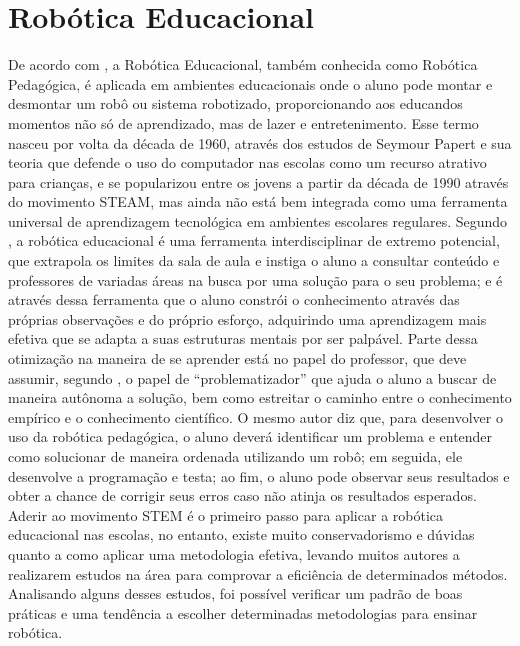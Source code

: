\section{Robótica Educacional}\label{sec:robot_educ}
De  acordo com \cite{nascimento}, a Robótica Educacional, também conhecida como Robótica Pedagógica, é aplicada em ambientes educacionais onde o aluno pode montar e desmontar um robô ou sistema robotizado, proporcionando aos educandos momentos não só de aprendizado, mas de lazer e entretenimento. Esse termo nasceu por volta da década de 1960, através dos estudos de Seymour Papert e sua teoria que defende o uso do computador nas escolas como um recurso atrativo para crianças, e se popularizou entre os jovens a partir da década de 1990 através do movimento STEAM, mas ainda não está bem integrada como uma ferramenta universal de aprendizagem tecnológica em ambientes escolares regulares. 
Segundo \cite{maisonnette}, a robótica educacional é uma ferramenta interdisciplinar de extremo potencial, que extrapola os limites da sala de aula e instiga o aluno a consultar conteúdo e professores de variadas áreas na busca por uma solução para o seu problema; e é através dessa ferramenta que o aluno constrói o conhecimento através das próprias observações e do próprio esforço, adquirindo uma aprendizagem mais efetiva que se adapta a suas estruturas mentais por ser palpável. Parte dessa otimização na maneira de se aprender está no papel do professor, que deve assumir, segundo \cite{nascimento}, o papel de “problematizador” que ajuda o aluno a buscar de maneira autônoma a solução, bem como estreitar o caminho entre o conhecimento empírico e o conhecimento científico. O mesmo autor diz que, para desenvolver o uso da robótica pedagógica, o aluno deverá identificar um problema e entender como solucionar de maneira ordenada utilizando um robô; em seguida, ele desenvolve a programação e testa; ao fim, o aluno pode observar seus resultados e obter a chance de corrigir seus erros caso não atinja os resultados esperados. 
Aderir ao movimento STEM é o primeiro passo para aplicar a robótica educacional nas escolas, no entanto, existe muito conservadorismo e dúvidas quanto a como aplicar uma metodologia efetiva, levando muitos autores a realizarem estudos na área para comprovar a eficiência de determinados métodos. Analisando alguns desses estudos, foi possível verificar um padrão de boas práticas e uma tendência a escolher determinadas metodologias para ensinar robótica.
